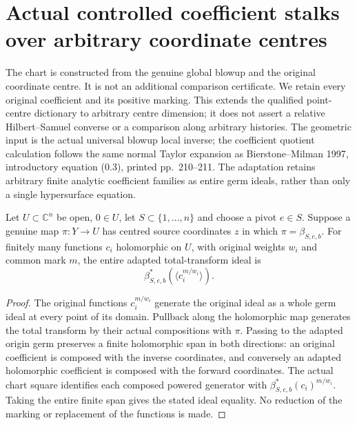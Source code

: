 \section{Actual controlled coefficient stalks over arbitrary coordinate centres}
\label{chap:actual-centre-weighted-controlled-stalk}

The chart is constructed from the genuine global blowup and the original coordinate centre. It is not an additional comparison certificate. We retain every original coefficient and its positive marking. This extends the qualified point-centre dictionary to arbitrary centre dimension; it does not assert a relative Hilbert--Samuel converse or a comparison along arbitrary histories. The geometric input is the actual universal blowup local inverse; the coefficient quotient calculation follows the same normal Taylor expansion as Bierstone--Milman 1997, introductory equation (0.3), printed pp.~210--211. The adaptation retains arbitrary finite analytic coefficient families as entire germ ideals, rather than only a single hypersurface equation.

\begin{lemma}
\label{hir:actual-centre-weighted-total-stalk}
\leanok
Let $U\subset\mathbb C^n$ be open, $0\in U$, let $S\subset\{1,\ldots,n\}$ and choose a pivot $e\in S$. Suppose a genuine map $\pi:Y\to U$ has centred source coordinates $z$ in which $\pi=\beta_{S,e,b}$. For finitely many functions $c_i$ holomorphic on $U$, with original weights $w_i$ and common mark $m$, the entire adapted total-transform ideal is
\[
 \beta_{S,e,b}^*(\langle c_i^{m/w_i}\rangle).
\]
\end{lemma}
\begin{proof}
The original functions $c_i^{m/w_i}$ generate the original ideal as a whole germ ideal at every point of its domain. Pullback along the holomorphic map generates the total transform by their actual compositions with $\pi$. Passing to the adapted origin germ preserves a finite holomorphic span in both directions: an original coefficient is composed with the inverse coordinates, and conversely an adapted holomorphic coefficient is composed with the forward coordinates. The actual chart square identifies each composed powered generator with $\beta_{S,e,b}^*(c_i)^{m/w_i}$. Taking the entire finite span gives the stated ideal equality. No reduction of the marking or replacement of the functions is made.
\end{proof}

